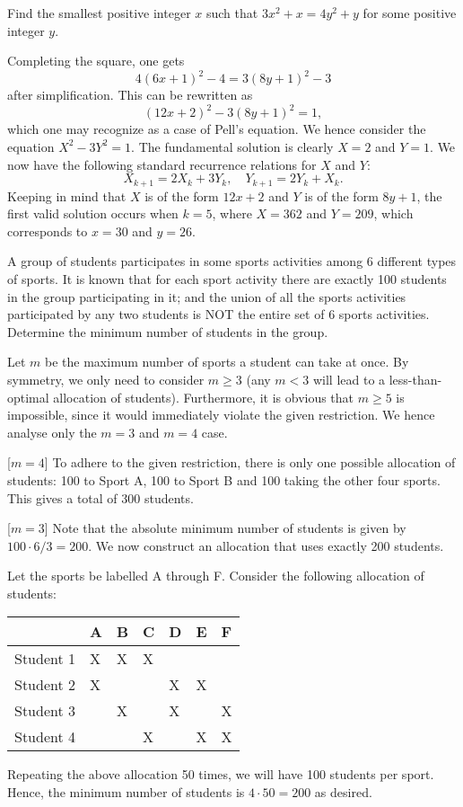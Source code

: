 \begin{question}[30]\label{A::2022-O-1-21}
    Find the smallest positive integer $x$ such that $3x^2 + x = 4y^2 + y$ for some positive integer $y$.
\end{question}

Completing the square, one gets \[4(6x+1)^2 - 4 = 3(8y+1)^2 - 3\] after simplification. This can be rewritten as \[(12x+2)^2 - 3(8y+1)^2 = 1,\] which one may recognize as a case of Pell's equation. We hence consider the equation $X^2 - 3Y^2 = 1$. The fundamental solution is clearly $X = 2$ and $Y = 1$. We now have the following standard recurrence relations for $X$ and $Y$: \[X_{k+1} = 2X_k + 3Y_k, \quad Y_{k+1} = 2Y_k + X_k.\] Keeping in mind that $X$ is of the form $12x + 2$ and $Y$ is of the form $8y +1$, the first valid solution occurs when $k = 5$, where $X = 362$ and $Y = 209$, which corresponds to $x = 30$ and $y = 26$.

\begin{question}[200]\label{A::2022-O-1-22}
    A group of students participates in some sports activities among 6 different types of sports. It is known that for each sport activity there are exactly 100 students in the group participating in it; and the union of all the sports activities participated by any two students is NOT the entire set of 6 sports activities. Determine the minimum number of students in the group.
\end{question}

Let $m$ be the maximum number of sports a student can take at once. By symmetry, we only need to consider $m \geq 3$ (any $m < 3$ will lead to a less-than-optimal allocation of students). Furthermore, it is obvious that $m \geq 5$ is impossible, since it would immediately violate the given restriction. We hence analyse only the $m = 3$ and $m = 4$ case.

[$m = 4$] To adhere to the given restriction, there is only one possible allocation of students: 100 to Sport A, 100 to Sport B and 100 taking the other four sports. This gives a total of 300 students.

[$m = 3$] Note that the absolute minimum number of students is given by $100 \cdot 6 / 3 = 200$. We now construct an allocation that uses exactly 200 students.

Let the sports be labelled A through F. Consider the following allocation of students:
\begin{table}[H]
    \centering
    \begin{tabular}{|l|l|l|l|l|l|l|}
    \hline
     & A & B & C & D & E & F \\ \hline
    Student 1 & X & X & X &  &  &  \\ \hline
    Student 2 & X &  &  & X & X &  \\ \hline
    Student 3 &  & X &  & X &  & X \\ \hline
    Student 4 &  &  & X &  & X & X \\ \hline
    \end{tabular}
\end{table}
Repeating the above allocation 50 times, we will have 100 students per sport. Hence, the minimum number of students is $4 \cdot 50 = 200$ as desired.

